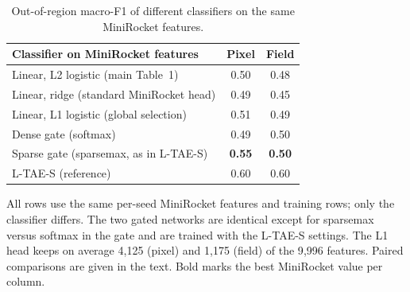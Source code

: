 \documentclass[preprint,authoryear,3p]{elsarticle}
\begin{document}
\begin{table}[!ht]
\centering
\caption{Out-of-region macro-F1 of different classifiers on the same MiniRocket features.}
\label{stab:mrsparse}
\renewcommand{\arraystretch}{1.08}
\setlength{\tabcolsep}{5pt}
\footnotesize
\begin{tabular}{lcc}
\toprule
\textbf{Classifier on MiniRocket features} & \textbf{Pixel} & \textbf{Field} \\
\midrule
Linear, L2 logistic (main Table~1) & 0.50 & 0.48 \\
Linear, ridge (standard MiniRocket head) & 0.49 & 0.45 \\
Linear, L1 logistic (global selection) & 0.51 & 0.49 \\
Dense gate (softmax) & 0.49 & 0.50 \\
Sparse gate (sparsemax, as in L-TAE-S) & \textbf{0.55} & \textbf{0.50} \\
\midrule
L-TAE-S (reference) & 0.60 & 0.60 \\
\bottomrule
\end{tabular}
\par\vspace{3pt}
\begin{minipage}{\linewidth}
\footnotesize
All rows use the same per-seed MiniRocket features and training rows; only the classifier differs. The two gated networks are identical except for sparsemax versus softmax in the gate and are trained with the L-TAE-S settings. The L1 head keeps on average 4{,}125 (pixel) and 1{,}175 (field) of the 9{,}996 features. Paired comparisons are given in the text. Bold marks the best MiniRocket value per column.
\end{minipage}
\end{table}

\clearpage


\end{document}
